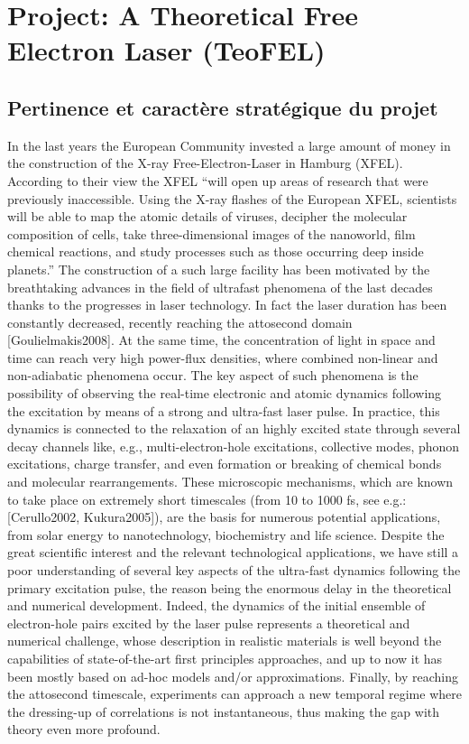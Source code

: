 \chapter{Project: A Theoretical Free Electron Laser (TeoFEL)}

\section{Pertinence et caractère stratégique du projet}

In the last years the European Community invested a large amount of money in the construction of the X-ray Free-Electron-Laser in Hamburg (XFEL). According to their view the XFEL  “will open up areas of research that were previously inaccessible. Using the X-ray flashes of the European XFEL, scientists will be able to map the atomic details of viruses, decipher the molecular composition of cells, take three-dimensional images of the nanoworld, film chemical reactions, and study processes such as those occurring deep inside planets.”  The construction of a such large facility has been motivated by the breathtaking advances in the field of ultrafast phenomena of the last decades thanks to the progresses in laser technology. In fact the laser duration has been constantly decreased, recently reaching the attosecond domain [Goulielmakis2008]. At the same time, the concentration of light in space and time can reach very high power-flux densities, where combined non-linear and non-adiabatic phenomena occur. 
The key aspect of such phenomena is the possibility of observing the real-time electronic and atomic dynamics following the excitation by means of a strong and ultra-fast laser pulse. In practice, this dynamics is connected to the relaxation of an highly excited state through several decay channels like, e.g., multi-electron-hole excitations, collective modes, phonon excitations, charge transfer, and even formation or breaking of chemical bonds and molecular rearrangements. These microscopic mechanisms, which are known to take place on extremely short timescales (from 10 to 1000 fs, see e.g.: [Cerullo2002, Kukura2005]), are the basis for numerous potential applications, from solar energy to nanotechnology, biochemistry and life science. 
Despite the great scientific interest and the relevant technological applications, we have still a poor understanding of several key aspects of the ultra-fast dynamics following the primary excitation pulse, the reason being the enormous delay in the theoretical and numerical development. Indeed, the dynamics of the initial ensemble of electron-hole pairs excited by the laser pulse represents a theoretical and numerical challenge, whose description in realistic materials is well beyond the capabilities of state-of-the-art first principles approaches, and up to now it has been mostly based on ad-hoc models and/or approximations. Finally, by reaching the attosecond timescale, experiments can approach a new temporal regime where the dressing-up of correlations is not instantaneous, thus making the gap with theory even more profound. 
